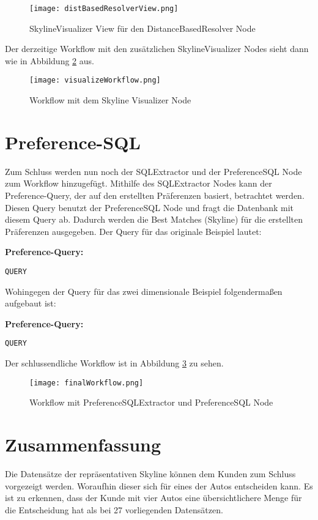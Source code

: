 \begin{figure}[H]
	\centering
	\texttt{[image: distBasedResolverView.png]}
	\caption{SkylineVisualizer View für den DistanceBasedResolver Node}
	\label{img:distBasedResolverView}
\end{figure} 

Der derzeitige Workflow mit den zusätzlichen SkylineVisualizer Nodes sieht dann wie in Abbildung \ref{img:visualizeWorkflow} aus.

\begin{figure}[H]
	\centering
	\texttt{[image: visualizeWorkflow.png]}
	\caption{Workflow mit dem Skyline Visualizer Node}
	\label{img:visualizeWorkflow}
\end{figure} 

\section{Preference-SQL}
\label{ch:Evaluierung:sec:prefSQL}
Zum Schluss werden nun noch der SQLExtractor und der PreferenceSQL Node zum Workflow hinzugefügt. Mithilfe des SQLExtractor Nodes kann der Preference-Query, der auf den erstellten Präferenzen basiert, betrachtet werden. Diesen Query benutzt der PreferenceSQL Node und fragt die Datenbank mit diesem Query ab. Dadurch werden die Best Matches (Skyline) für die erstellten Präferenzen ausgegeben. Der Query für das originale Beispiel lautet:
 
\textbf{Preference-Query:}
\begin{lstlisting}
QUERY
\end{lstlisting}

Wohingegen der Query für das zwei dimensionale Beispiel folgendermaßen aufgebaut ist:

\textbf{Preference-Query:}
\begin{lstlisting}
QUERY
\end{lstlisting}

Der schlussendliche Workflow ist in Abbildung \ref{img:finalWorkflow} zu sehen. 
 
\begin{figure}[H]
	\centering
	\texttt{[image: finalWorkflow.png]}
	\caption{Workflow mit PreferenceSQLExtractor und PreferenceSQL Node}
	\label{img:finalWorkflow}
\end{figure} 
\section{Zusammenfassung}
\label{ch:Evaluierung:sec:zusammenfassung}
Die Datensätze der repräsentativen Skyline können dem Kunden zum Schluss vorgezeigt werden. Woraufhin dieser sich für eines der Autos entscheiden kann. Es ist zu erkennen, dass der Kunde mit vier Autos eine übersichtlichere Menge für die Entscheidung hat als bei 27 vorliegenden Datensätzen.

